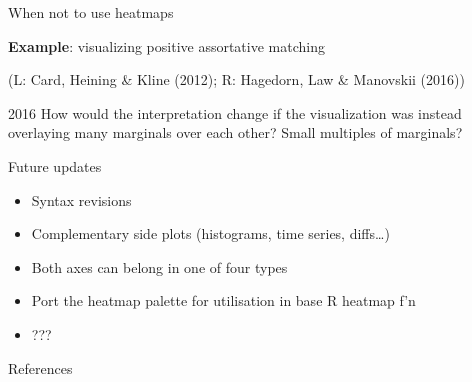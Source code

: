 \begin{frame}{When not to use heatmaps}

\textbf{Example}: visualizing positive assortative matching


\footnotesize

(L: Card, Heining \& Kline (2012); R: Hagedorn, Law \& Manovskii (2016))

\normalsize
2016
How would the interpretation change if the visualization was instead
overlaying many marginals over each other? Small multiples of marginals?

\end{frame}





\begin{frame}{Future updates}

\begin{itemize}
        \item Syntax revisions
        \item Complementary side plots (histograms, time series, diffs\ldots)
        \item Both axes can belong in one of four types
        \item Port the heatmap palette for utilisation in base R heatmap f'n
        \item ???
\end{itemize}

\end{frame}

\begin{frame}{References}

\end{frame}

{
}



